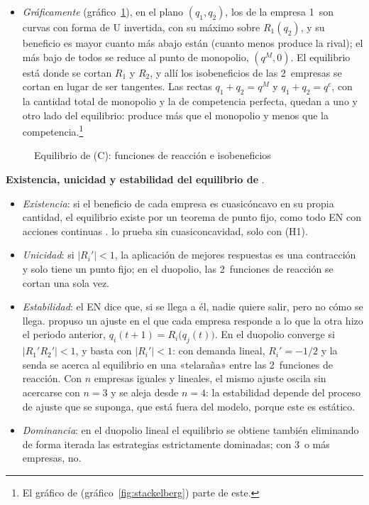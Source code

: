 \documentclass[11pt]{article}
\begin{document}
\begin{itemize}
\item \emph{Gráficamente} (gráfico~\ref{fig:cournot}), en el plano $(q_1,q_2)$, los  de la empresa 1~son curvas con forma de U invertida, con su máximo sobre $R_1(q_2)$, y su beneficio es mayor cuanto más abajo están (cuanto menos produce la rival); el más bajo de todos se reduce al punto de monopolio, $(q^M,0)$. El equilibrio está donde se cortan $R_1$ y $R_2$, y allí los isobeneficios de las 2~empresas se cortan en lugar de ser tangentes. Las rectas $q_1+q_2=q^M$ y $q_1+q_2=q^c$, con la cantidad total de monopolio y la de competencia perfecta, quedan a uno y otro lado del equilibrio:  produce más que el monopolio y menos que la competencia.\footnote{El gráfico de  (gráfico~\ref{fig:stackelberg}) parte de este.}
\end{itemize}

\begin{figure}[H]
\centering
\caption{Equilibrio de  (C): funciones de reacción e isobeneficios}\label{fig:cournot}
\end{figure}

\begin{anotaciones}
\textbf{Existencia, unicidad y estabilidad del equilibrio de }\nocite{Vives1999Oligopoly}.
\begin{itemize}
\item \emph{Existencia}: si el beneficio de cada empresa es cuasicóncavo en su propia cantidad, el equilibrio existe por un teorema de punto fijo, como todo EN con acciones continuas . \textcite{Novshek1985Existence} lo prueba sin cuasiconcavidad, solo con (H1).
\item \emph{Unicidad}: si $|R_i'|<1$, la aplicación de mejores respuestas es una contracción y solo tiene un punto fijo; en el duopolio, las 2~funciones de reacción se cortan una sola vez.
\item \emph{Estabilidad}: el EN dice que, si se llega a él, nadie quiere salir, pero no cómo se llega.  propuso un ajuste en el que cada empresa responde a lo que la otra hizo el periodo anterior, $q_i(t+1)=R_i\big(q_j(t)\big)$. En el duopolio converge si $|R_1'R_2'|<1$, y basta con $|R_i'|<1$: con demanda lineal, $R_i'=-1/2$ y la senda se acerca al equilibrio en una «telaraña» entre las 2~funciones de reacción\nocite{Hahn1962Stability}. Con $n$ empresas iguales y lineales, el mismo ajuste oscila sin acercarse con $n=3$ y se aleja desde $n=4$\nocite{Theocharis1960Stability}: la estabilidad depende del proceso de ajuste que se suponga, que está fuera del modelo, porque este es estático.
\item \emph{Dominancia}: en el duopolio lineal el equilibrio se obtiene también eliminando de forma iterada las estrategias estrictamente dominadas\nocite{Gibbons1992Game}; con 3~o más empresas, no.
\end{itemize}
\end{anotaciones}
\end{document}
